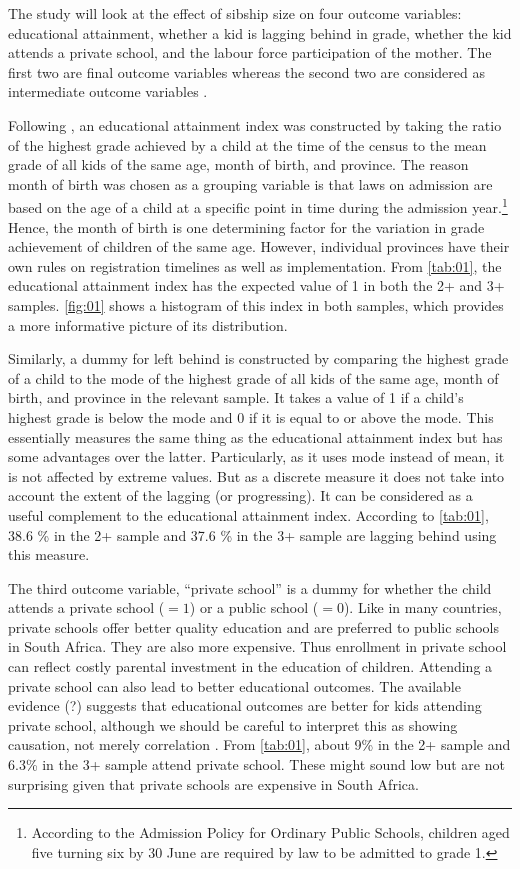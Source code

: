 The study will look at the effect of sibship size on four outcome variables: educational attainment, whether a kid is lagging behind in grade, whether the kid attends a private school, and the labour force participation of the mother. The first two are final outcome variables whereas the second two are considered as intermediate outcome variables \parencite{caceres-delpiano_impacts_2006}. 

Following \textcite{rosenzweig_testing_1980}, an educational attainment index was constructed by taking the ratio of the highest grade achieved by a child at the time of the census to the mean grade of all kids of the same age, month of birth, and province. The reason month of birth was chosen as a grouping variable is that laws on admission are based on the age of a child at a specific point in time during the admission year.\footnote{According to the Admission Policy for Ordinary Public Schools, children aged five turning six by 30 June are required by law to be admitted to grade 1.} Hence, the month of birth is one determining factor for the variation in grade achievement of children of the same age. However, individual provinces have their own rules on registration timelines as well as implementation. From \autoref{tab:01}, the educational attainment index has the expected value of 1 in both the 2+ and 3+ samples. \autoref{fig:01} shows a histogram of this index in both samples, which provides a more informative picture of its distribution. 

Similarly, a dummy for left behind is constructed by comparing the highest grade of a child to the mode of the highest grade of all kids of the same age, month of birth, and province in the relevant sample. It takes a value of 1 if a child’s highest grade is below the mode and 0 if it is equal to or above the mode. This essentially measures the same thing as the educational attainment index but has some advantages over the latter. Particularly, as it uses mode instead of mean, it is not affected by extreme values. But as a discrete measure it does not take into account the extent of the lagging (or progressing). It can be considered as a useful complement to the educational attainment index. According to \autoref{tab:01}, 38.6 \% in the 2+ sample and 37.6 \% in the 3+ sample are lagging behind using this measure. 

The third outcome variable, \enquote{private school} is a dummy for whether the child attends a private school ($ = 1 $) or a public school ($ = 0 $). Like in many countries, private schools offer better quality education and are preferred to public schools in South Africa. They are also more expensive. Thus enrollment in private school can reflect costly parental investment in the education of children. Attending a private school can also lead to better educational outcomes. The available evidence (?) suggests that educational outcomes are better for kids attending private school, although we should be careful to interpret this as showing causation, not merely correlation \parencite{caceres-delpiano_impacts_2006}. From \autoref{tab:01}, about 9\% in the 2+ sample and 6.3\% in the 3+ sample attend private school. These might sound low but are not surprising given that private schools are expensive in South Africa.

